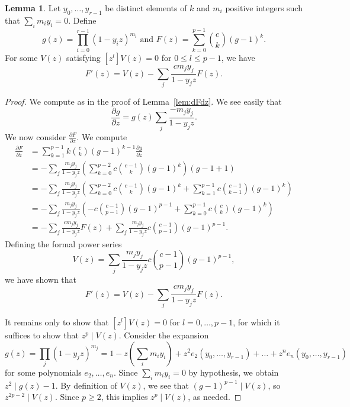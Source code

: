 \documentclass{amsart}
\numberwithin{equation}{section}
\theoremstyle{definition}
\newtheorem{lemma}[theorem]{Lemma}
\begin{document}
\begin{lemma}\label{lem:dFdz2}
Let $y_0,\dots,y_{r-1}$ be distinct elements of $k$ and $m_i$ positive integers such that $\sum_i m_iy_i=0$.  Define 
\[
g(z)=\prod_{i=0}^{r-1} (1-y_iz)^{m_i} \text{  and } F(z)=\sum_{k=0}^{p-1} \binom{c}{k}(g-1)^k.
\]
For some $V(z)$ satisfying $[z^l]V(z)=0$ for $0 \le l \le p-1$, we have
\[
F'(z)=V(z) - \sum_j \frac{cm_jy_j}{1-y_jz}F(z).
\]
\end{lemma}
\begin{proof}
We compute as in the proof of Lemma~\ref{lem:dFdz}. We see easily that 
\[
\frac{\partial g}{\partial z} = g(z) \sum_j \frac{-m_jy_j}{1-y_jz}.
\]
We now consider $\frac{\partial F}{\partial z}$. We compute
\begin{align*}
\frac{\partial F}{\partial z}%
&=\sum_{k=1}^{p-1}k\binom{c}{k}(g-1)^{k-1}\frac{\partial g}{\partial z}\\
&=- \sum_j\frac{m_jy_j}{1-y_jz}\left(\sum_{k=0}^{p-2}c\binom{c-1}{k}(g-1)^{k}\right)(g-1+1)\\
&=-\sum_j\frac{m_jy_j}{1-y_jz}\left(\sum_{k=0}^{p-2}c\binom{c-1}{k}(g-1)^{k}+\sum_{k=1}^{p-1}c\binom{c-1}{k-1}(g-1)^{k}\right)\\
&=-\sum_j \frac{m_jy_j}{1-y_jz}\left(-c\binom{c-1}{p-1}(g-1)^{p-1}+\sum_{k=0}^{p-1}c\binom{c}{k}(g-1)^{k}\right)\\
&=-\sum_j \frac{cm_jy_j}{1-y_jz}F(z) + \sum_j \frac{m_jy_j}{1-y_jz}c\binom{c-1}{p-1}(g-1)^{p-1}.
\end{align*}
Defining the formal power series
\[
V(z)=\sum_j \frac{m_jy_j}{1-y_jz} c\binom{c-1}{p-1}(g-1)^{p-1},
\]
we have shown that 
\[
F'(z)=V(z)- \sum_j \frac{cm_jy_j}{1-y_jz}F(z).
\]

It remains only to show that $[z^l]V(z)=0$ for $l=0,\dots,p-1$, for which it suffices to show that $z^p \mid V(z)$.  Consider the expansion
\[
g(z)=\prod_j (1-y_jz)^{m_j} = 1-z\left(\sum_i m_iy_i \right)+z^2e_2(y_0, \ldots, y_{r - 1})+\dots+z^ne_n(y_0, \ldots, y_{r - 1})
\]
for some polynomials $e_2,\dots,e_n$. Since $\sum_i m_iy_i=0$ by hypothesis, we obtain $z^2 \mid g(z)-1$.  By definition of $V(z)$, we see that $(g-1)^{p-1} \mid V(z)$, so $z^{2p-2} \mid V(z)$. Since $p \ge 2$, this implies $z^p \mid V(z)$, as needed.
\end{proof}
\end{document}

